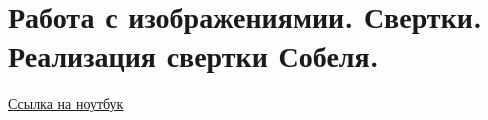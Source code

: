 \section{Работа с изображениямии. Свертки. Реализация свертки Собеля.}

\href{https://github.com/andriygav/School/blob/master/2018/AD/Lecture/Lecture14.ipynb}{Ссылка на ноутбук}